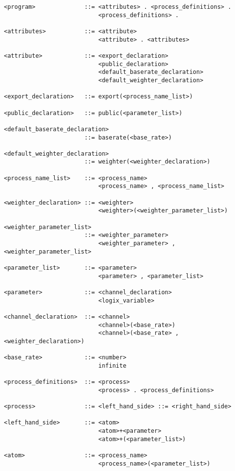 \begin{verbatim}
<program>              ::= <attributes> . <process_definitions> .
                           <process_definitions> .

<attributes>           ::= <attribute>
                           <attribute> . <attributes>

<attribute>            ::= <export_declaration>
                           <public_declaration>
                           <default_baserate_declaration>
                           <default_weighter_declaration>

<export_declaration>   ::= export(<process_name_list>)

<public_declaration>   ::= public(<parameter_list>)

<default_baserate_declaration>
                       ::= baserate(<base_rate>)

<default_weighter_declaration>
                       ::= weighter(<weighter_declaration>)

<process_name_list>    ::= <process_name>
                           <process_name> , <process_name_list>

<weighter_declaration> ::= <weighter>
                           <weighter>(<weighter_parameter_list>)

<weighter_parameter_list>
                       ::= <weighter_parameter>
                           <weighter_parameter> , <weighter_parameter_list>

<parameter_list>       ::= <parameter>
                           <parameter> , <parameter_list>

<parameter>            ::= <channel_declaration>
                           <logix_variable>

<channel_declaration>  ::= <channel>
                           <channel>(<base_rate>)
                           <channel>(<base_rate> , <weighter_declaration>)

<base_rate>            ::= <number>
                           infinite

<process_definitions>  ::= <process>
                           <process> . <process_definitions>

<process>              ::= <left_hand_side> ::= <right_hand_side>

<left_hand_side>       ::= <atom>
                           <atom>+<parameter>
                           <atom>+(<parameter_list>)

<atom>                 ::= <process_name>
                           <process_name>(<parameter_list>)


\end{verbatim}
